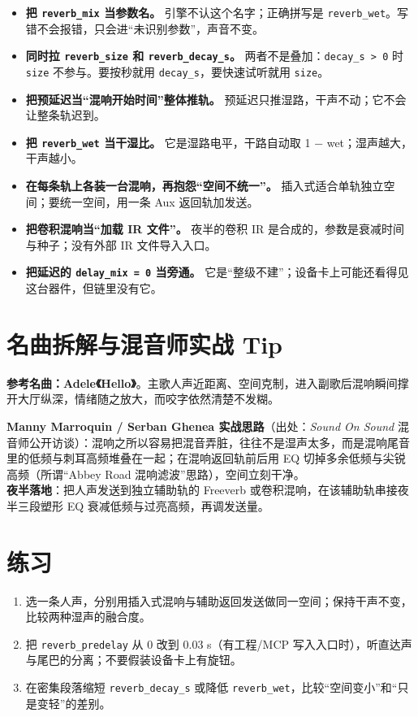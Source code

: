 \begin{itemize}
  \item \textbf{把 \texttt{reverb\_mix} 当参数名。} 引擎不认这个名字；正确拼写是 \texttt{reverb\_wet}。写错不会报错，只会进“未识别参数”，声音不变。
  \item \textbf{同时拉 \texttt{reverb\_size} 和 \texttt{reverb\_decay\_s}。} 两者不是叠加：\texttt{decay\_s > 0} 时 \texttt{size} 不参与。要按秒就用 \texttt{decay\_s}，要快速试听就用 \texttt{size}。
  \item \textbf{把预延迟当“混响开始时间”整体推轨。} 预延迟只推湿路，干声不动；它不会让整条轨迟到。
  \item \textbf{把 \texttt{reverb\_wet} 当干湿比。} 它是湿路电平，干路自动取 1 − wet；湿声越大，干声越小。
  \item \textbf{在每条轨上各装一台混响，再抱怨“空间不统一”。} 插入式适合单轨独立空间；要统一空间，用一条 Aux 返回轨加发送。
  \item \textbf{把卷积混响当“加载 IR 文件”。} 夜半的卷积 IR 是合成的，参数是衰减时间与种子；没有外部 IR 文件导入入口。
  \item \textbf{把延迟的 \texttt{delay\_mix = 0} 当旁通。} 它是“整级不建”；设备卡上可能还看得见这台器件，但链里没有它。
\end{itemize}

\section{名曲拆解与混音师实战 Tip}

\textbf{参考名曲：Adele《Hello》}。主歌人声近距离、空间克制，进入副歌后混响瞬间撑开大厅纵深，情绪随之放大，而咬字依然清楚不发糊。

\begin{tipbox}
\textbf{Manny Marroquin / Serban Ghenea 实战思路}（出处：\emph{Sound On Sound} 混音师公开访谈）：混响之所以容易把混音弄脏，往往不是湿声太多，而是混响尾音里的低频与刺耳高频堆叠在一起；在混响返回轨前后用 EQ 切掉多余低频与尖锐高频（所谓“Abbey Road 混响滤波”思路），空间立刻干净。\\
\textbf{夜半落地}：把人声发送到独立辅助轨的 Freeverb 或卷积混响，在该辅助轨串接夜半三段塑形 EQ 衰减低频与过亮高频，再调发送量。
\end{tipbox}

\section{练习}


\begin{exercise}
\begin{enumerate}
  \item 选一条人声，分别用插入式混响与辅助返回发送做同一空间；保持干声不变，比较两种湿声的融合度。
  \item 把 \texttt{reverb\_predelay} 从 0 改到 0.03 s（有工程/MCP 写入入口时），听直达声与尾巴的分离；不要假装设备卡上有旋钮。
  \item 在密集段落缩短 \texttt{reverb\_decay\_s} 或降低 \texttt{reverb\_wet}，比较“空间变小”和“只是变轻”的差别。
\end{enumerate}
\end{exercise}


